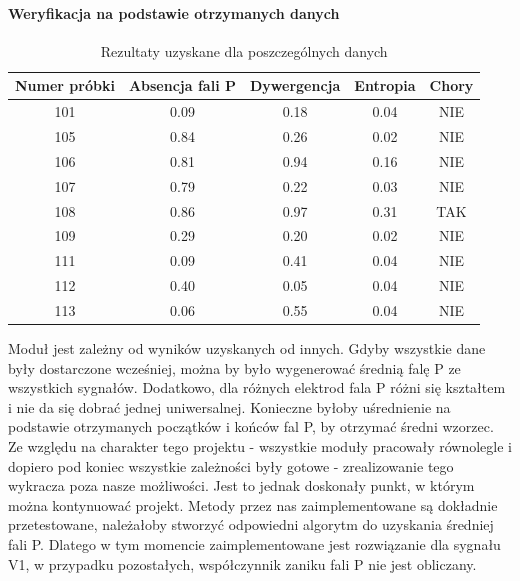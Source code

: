 \paragraph{Weryfikacja na podstawie otrzymanych danych}

\begin{table}[ht]

\centering
    \begin{tabular}{c c c c c}
    \hline \hline
    Numer próbki & Absencja fali P &Dywergencja & Entropia &Chory \\
    \hline
    101 &0.09 &0.18 &0.04 &NIE\\
    105 &0.84 &0.26 &0.02 &NIE\\
    106 &0.81 &0.94 &0.16 &NIE\\
    107 &0.79 &0.22 &0.03 &NIE\\
    108 &0.86 &0.97 &0.31 &TAK\\
    109 &0.29 &0.20 &0.02 &NIE\\
    111 &0.09 &0.41 &0.04 &NIE\\
    112 &0.40 &0.05 &0.04 &NIE\\
    113 &0.06 &0.55 &0.04 &NIE\\
    \end{tabular}
    \caption{Rezultaty uzyskane dla poszczególnych danych}
\end{table}

Moduł jest zależny od wyników uzyskanych od innych. 
Gdyby wszystkie dane były dostarczone wcześniej, można by było wygenerować średnią falę P ze wszystkich sygnałów.
Dodatkowo, dla różnych elektrod fala P różni się kształtem i nie da się dobrać jednej uniwersalnej.
Konieczne byłoby uśrednienie na podstawie otrzymanych początków i końców fal P, by otrzymać średni wzorzec.
Ze względu na charakter tego projektu - wszystkie moduły pracowały równolegle i dopiero pod koniec wszystkie zależności były gotowe - 
zrealizowanie tego wykracza poza nasze możliwości.
Jest to jednak doskonały punkt, w którym można kontynuować projekt.
Metody przez nas zaimplementowane są dokładnie przetestowane, należałoby stworzyć odpowiedni algorytm do uzyskania średniej fali P.
Dlatego w tym momencie zaimplementowane jest rozwiązanie dla sygnału V1, w przypadku pozostałych, współczynnik zaniku fali P nie jest obliczany.

